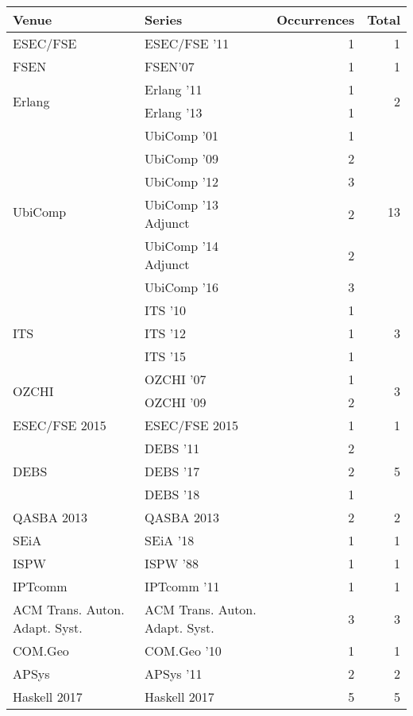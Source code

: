 \begin{table*}[t]
\begin{tabular}{llrr}
Venue & Series & Occurrences & Total\\\hline
\multirow{1}{*}{ESEC/FSE } & ESEC/FSE '11 & 1 & \multirow{1}{*}{1}\\
\multirow{1}{*}{FSEN} & FSEN'07 & 1 & \multirow{1}{*}{1}\\
\multirow{2}{*}{Erlang } & Erlang '11 & 1 & \multirow{2}{*}{2}\\
& Erlang '13 & 1 &\\
\multirow{6}{*}{UbiComp } & UbiComp '01 & 1 & \multirow{6}{*}{13}\\
& UbiComp '09 & 2 &\\
& UbiComp '12 & 3 &\\
& UbiComp '13 Adjunct & 2 &\\
& UbiComp '14 Adjunct & 2 &\\
& UbiComp '16 & 3 &\\
\multirow{3}{*}{ITS } & ITS '10 & 1 & \multirow{3}{*}{3}\\
& ITS '12 & 1 &\\
& ITS '15 & 1 &\\
\multirow{2}{*}{OZCHI } & OZCHI '07 & 1 & \multirow{2}{*}{3}\\
& OZCHI '09 & 2 &\\
\multirow{1}{*}{ESEC/FSE 2015} & ESEC/FSE 2015 & 1 & \multirow{1}{*}{1}\\
\multirow{3}{*}{DEBS } & DEBS '11 & 2 & \multirow{3}{*}{5}\\
& DEBS '17 & 2 &\\
& DEBS '18 & 1 &\\
\multirow{1}{*}{QASBA 2013} & QASBA 2013 & 2 & \multirow{1}{*}{2}\\
\multirow{1}{*}{SEiA } & SEiA '18 & 1 & \multirow{1}{*}{1}\\
\multirow{1}{*}{ISPW } & ISPW '88 & 1 & \multirow{1}{*}{1}\\
\multirow{1}{*}{IPTcomm } & IPTcomm '11 & 1 & \multirow{1}{*}{1}\\
\multirow{1}{*}{ACM Trans. Auton. Adapt. Syst.} & ACM Trans. Auton. Adapt. Syst. & 3 & \multirow{1}{*}{3}\\
\multirow{1}{*}{COM.Geo } & COM.Geo '10 & 1 & \multirow{1}{*}{1}\\
\multirow{1}{*}{APSys } & APSys '11 & 2 & \multirow{1}{*}{2}\\
\multirow{1}{*}{Haskell 2017} & Haskell 2017 & 5 & \multirow{1}{*}{5}\\

\end{tabular}
\end{table*}
